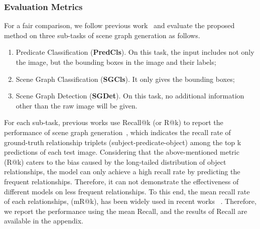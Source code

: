 \subsubsection{Evaluation Metrics}
For a fair comparison, we follow previous work~\cite{Zellers_2018_CVPR,Tang2020_unbiased,li2021bipartite} and evaluate the proposed method on three sub-tasks of scene graph generation as follows.
\begin{enumerate}
	\item Predicate Classification (\textbf{PredCls}). On this task, the input includes not only the image, but the bounding boxes in the image and their labels;
	\item Scene Graph Classification (\textbf{SGCls}). It only gives the bounding boxes;
	\item Scene Graph Detection (\textbf{SGDet}). On this task, no additional information other than the raw image will be given.
\end{enumerate}
For each sub-task, previous works use Recall@k (or R@k) to report the performance of scene graph generation~\cite{Lu16,Xu2017}, which indicates the recall rate of ground-truth relationship triplets (subject-predicate-object) among the top k predictions of each test image.
Considering that the above-mentioned metric (R@k) caters to the bias caused by the long-tailed distribution of object relationships, the model can only achieve a high recall rate by predicting the frequent relationships. Therefore, it can not demonstrate the effectiveness of different models on less frequent relationships. To this end, the mean recall rate of each relationships, (mR@k), has been widely used in recent works ~\cite{Zellers_2018_CVPR,VCTree_tang,Tang2020_unbiased,li2021bipartite}. Therefore, we report the performance using the mean Recall, and the results of Recall are available in the appendix.

